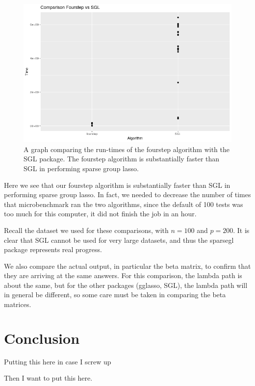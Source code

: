 \documentclass[titlepage]{article}
\begin{document}
\begin{figure}[tb!]
\centering
\includegraphics[scale=0.5]{fourvsSGL.png}
\caption{A graph comparing the run-times of the fourstep algorithm with the SGL package. The fourstep algorithm is substantially faster than SGL in performing sparse group lasso.}
\label{fig:fourvsSGL}
\end{figure}


Here we see that our fourstep algorithm is substantially faster than SGL in performing sparse group lasso. In fact, we needed to decrease the number of times that microbenchmark ran the two algorithms, since the default of 100 tests was too much for this computer, it did not finish the job in an hour.

Recall the dataset we used for these comparisons, with $n=100$ and $p=200$. It is clear that SGL cannot be used for very large datasets, and thus the sparsegl package represents real progress.


We also compare the actual output, in particular the beta matrix, to confirm that they are arriving at the same answers. For this comparison, the lambda path is about the same, but for the other packages (gglasso, SGL), the lambda path will in general be different, so some care must be taken in comparing the beta matrices.

\section{Conclusion}


Putting this here in case I screw up \citep{tibshirani2012strong}

Then I want to put this \citep{yang2015fast} here.
\end{document}
